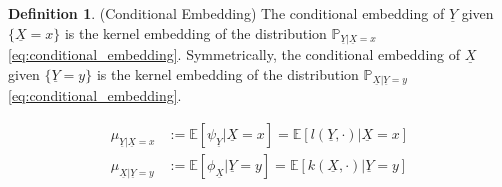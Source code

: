 \documentclass[twoside]{article} \usepackage{aistats2017}
\theoremstyle{definition}
\newtheorem{definition}[theorem]{Definition}
\newcommand{\rv}[1]{\underline{#1}}
\newcommand{\expect}[1]{{\mathbb{E}[#1]}}
\newcommand{\muYx}{\mu_{\rv{Y} | \rv{X} = x}}
\newcommand{\muXy}{\mu_{\rv{X} | \rv{Y} = y}}
\newcommand{\phiX}{\phi_{\rv{X}}}
\newcommand{\psiY}{\psi_{\rv{Y}}}
\begin{document}
	\begin{definition} \label{def:conditional_embedding}
		(Conditional Embedding)
		The conditional embedding of $\rv{Y}$ given $\{\rv{X} = x\}$ is the kernel embedding of the distribution $\mathbb{P}_{\rv{Y} | \rv{X} = x}$ \eqref{eq:conditional_embedding}. Symmetrically, the conditional embedding of $\rv{X}$ given $\{\rv{Y} = y\}$ is the kernel embedding of the distribution $\mathbb{P}_{\rv{X} | \rv{Y} = y}$ \eqref{eq:conditional_embedding}.
		
		\begin{equation}
		\begin{aligned}
			\muYx &:= \expect{\psiY | \rv{X} = x} = \expect{l(\rv{Y}, \cdot) | \rv{X} = x} \\
			\muXy &:= \expect{\phiX | \rv{Y} = y} = \expect{k(\rv{X}, \cdot) | \rv{Y} = y}
		\label{eq:conditional_embedding}
		\end{aligned}
		\end{equation}
	\end{definition}
	
\end{document}
